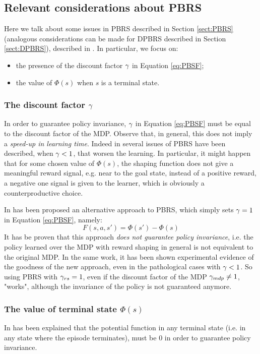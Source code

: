 \subsection{Relevant considerations about PBRS}\label{sect:PBRS-no-gamma}
Here we talk about some issues in PBRS described in Section \ref{sect:PBRS} (analogous considerations can be made for DPBRS described in Section \ref{sect:DPBRS}), described in \citep{5381523, grzes2010improving, Grzes:2017:RSE:3091125.3091208}. In particular, we focus on:
\begin{itemize}
	\item the presence of the discount factor $\gamma$ in Equation \ref{eq:PBSF};
	\item the value of $\Phi(s)$ when $s$ is a terminal state.
\end{itemize}

\subsubsection{The discount factor $\gamma$}
In order to guarantee policy invariance, $\gamma$ in Equation \ref{eq:PBSF} must be equal to the discount factor of the MDP.
Observe that, in general, this does not imply a \emph{speed-up in learning time}. Indeed in \citep{grzes2010improving, 5381523} several issues of PBRS have been described, when $\gamma<1$, that worsen the learning. In particular, it might happen that for some chosen value of $\Phi(s)$, the shaping function does not give a meaningful reward signal, e.g. near to the goal state, instead of a positive reward, a negative one signal is given to the learner, which is obviously a counterproductive choice.

In \citep{grzes2010improving} has been proposed an alternative approach to PBRS, which simply sets $\gamma=1$ in Equation \ref{eq:PBSF}, namely:
\begin{equation}\label{eq:PBRS-no-gamma}
F(s,a,s') = \Phi(s') - \Phi(s)
\end{equation}
It has be proven that this approach \emph{does not guarantee policy invariance}, i.e. the policy learned over the MDP with reward shaping in general is not equivalent to the original MDP. In the same work, it has been shown experimental evidence of the goodness of the new approach, even in the pathological cases with $\gamma<1$. 
So using PBRS with $\gamma_{rs}=1$, even if the discount factor of the MDP $\gamma_{mdp}\neq1$, "works", although the invariance of the policy is not guaranteed anymore.
\subsubsection{The value of terminal state $\Phi(s)$}
In \citep{Grzes:2017:RSE:3091125.3091208} has been explained that the potential function in any terminal state (i.e. in any state where the episode terminates), must be 0 in order to guarantee policy invariance.  

